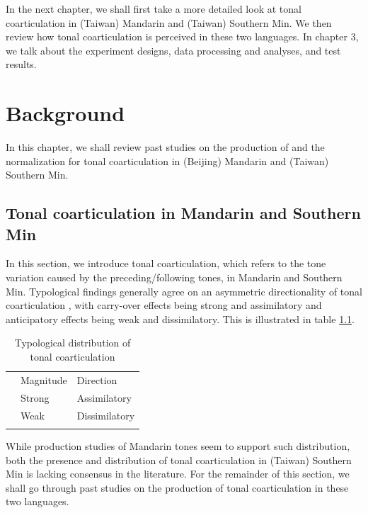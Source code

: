 \documentclass[12pt]{report}
\begin{document}
\begin{CJK}{UTF8}{bsmi}
In the next chapter, we shall first take a more detailed look at tonal coarticulation in (Taiwan) Mandarin and (Taiwan) Southern Min. We then review how tonal coarticulation is perceived in these two languages. In chapter 3, we talk about the experiment designs, data processing and analyses, and test results.

\pagebreak
\chapter{Background}

In this chapter, we shall review past studies on the production of and the normalization for tonal coarticulation in (Beijing) Mandarin and (Taiwan) Southern Min. 
\section{Tonal coarticulation in Mandarin and Southern Min}\label{section:Tonal coarticulation in Mandarin and Southern Min}
In this section, we introduce tonal coarticulation, which refers to the tone variation caused by the preceding/following tones, in Mandarin and Southern Min. Typological findings generally agree on an asymmetric directionality of tonal coarticulation \citep{ChangHsieh2012}, with carry-over effects being strong and assimilatory and anticipatory effects being weak and dissimilatory. This is illustrated in table \ref{table:Typologicaldistribution}.

\begin{flushleft}
\begin{table}[hbt!]
\begin{tabularx}{\textwidth}{l|X|X|}
\hhline{~--}
 & Magnitude & Direction \\
\hhline{~|--}\noalign{\vspace*{\doublerulesep}}
\hhline{-||--}
\multicolumn{1}{|l||}{Carry-over} & Strong & Assimilatory\\
\hhline{-||--}
\multicolumn{1}{|l||}{Anticipatory} & Weak & Dissimilatory\\
\hhline{-||--}
\end{tabularx}
\caption{Typological distribution of tonal coarticulation}
\label{table:Typologicaldistribution}
\end{table}
\end{flushleft}

While production studies of Mandarin tones seem to support such distribution, both the presence and distribution of tonal coarticulation in (Taiwan) Southern Min is lacking consensus in the literature. For the remainder of this section, we shall go through past studies on the production of tonal coarticulation in these two languages.


\end{CJK}
\end{document}
